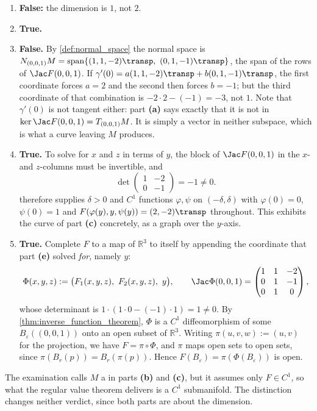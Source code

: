 \begin{exercisesolution}
\begin{enumerate}[label=\textbf{(\alph*)}]
    inside $M$, then $F\circ\gamma$ would be constant and the derivative would vanish. So
    $\gamma$ meets $M$ at $t=0$ and immediately leaves it.
  \item \textbf{False:} the dimension is $1$, not $2$.
  \item \textbf{True.}
  \item \textbf{False.} By \cref{def:normal_space} the normal space is
    $N_{(0,0,1)}M = \operatorname{span}\{(1,1,-2)\transp,\ (0,1,-1)\transp\}$, the span of the
    rows of $\Jac F(0,0,1)$. If $\gamma'(0) = a(1,1,-2)\transp + b(0,1,-1)\transp$, the first
    coordinate forces $a = 2$ and the second then forces $b = -1$; but the third coordinate of
    that combination is $-2\cdot2 - (-1) = -3$, not $1$. Note that $\gamma'(0)$ is not tangent
    either: part \textbf{(a)} says exactly that it is not in $\ker\Jac F(0,0,1) = T_{(0,0,1)}M$.
    It is simply a vector in neither subspace, which is what a curve leaving $M$ produces.
  \item \textbf{True.} To solve for $x$ and $z$ in terms of $y$, the block of $\Jac F(0,0,1)$ in
    the $x$- and $z$-columns must be invertible, and
    \[\det\begin{pmatrix} 1 & -2 \\ 0 & -1\end{pmatrix} = -1 \neq 0 .\]
     therefore supplies $\delta > 0$ and $C^1$ functions
    $\varphi,\psi$ on $(-\delta,\delta)$ with $\varphi(0) = 0$, $\psi(0) = 1$ and
    $F(\varphi(y),y,\psi(y)) = (2,-2)\transp$ throughout. This exhibits the curve of part
    \textbf{(c)} concretely, as a graph over the $y$-axis.
  \item \textbf{True.} Complete $F$ to a map of $\mathbb{R}^3$ to itself by appending the
    coordinate that part \textbf{(e)} solved \emph{for}, namely $y$:
    \[\Phi(x,y,z) := \big(F_1(x,y,z),\ F_2(x,y,z),\ y\big), \qquad
      \Jac\Phi(0,0,1) = \begin{pmatrix} 1 & 1 & -2 \\ 0 & 1 & -1 \\ 0 & 1 & 0\end{pmatrix},\]
    whose determinant is $1 \cdot (1\cdot 0 - (-1)\cdot 1) = 1 \neq 0$. By
    \cref{thm:inverse_function_theorem}, $\Phi$ is a $C^1$ diffeomorphism of some
    $B_\varepsilon((0,0,1))$ onto an open subset of $\mathbb{R}^3$. Writing $\pi(u,v,w) := (u,v)$
    for the projection, we have $F = \pi\circ\Phi$, and $\pi$ maps open sets to open sets, since
    $\pi(B_r(p)) = B_r(\pi(p))$. Hence $F(B_\varepsilon) = \pi(\Phi(B_\varepsilon))$ is open.
\end{enumerate}

\begin{ainote}
The examination calls $M$ a  in parts \textbf{(b)} and \textbf{(c)}, but it
assumes only $F \in C^1$, so what the regular value theorem delivers is a $C^1$ submanifold. The
distinction changes neither verdict, since both parts are about the dimension.
\end{ainote}
\end{exercisesolution}


